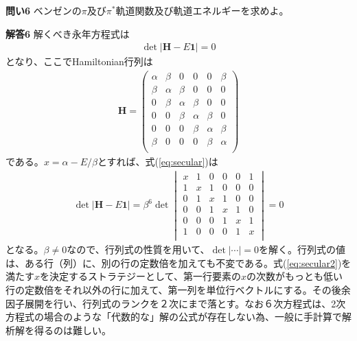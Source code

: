 \documentclass[11pt,pra,aps]{revtex4}
\begin{document}
\noindent
{\bf 問い6} ベンゼンの$\pi$及び$\pi^*$軌道関数及び軌道エネルギーを求めよ。

\noindent
{\bf 解答6}
解くべき永年方程式は
\begin{align}
  \det{|\mathbf{H}-E\mathbf{1}|}=0 \label{eq:secular}
\end{align}
となり、ここでHamiltonian行列は
\begin{align}
  \mathbf{H}=
  \begin{pmatrix}
    \alpha & \beta & 0 & 0 & 0 & \beta \\
    \beta & \alpha & \beta & 0 & 0 & 0 \\
    0 & \beta & \alpha & \beta & 0 & 0 \\
    0 & 0 & \beta & \alpha & \beta & 0 \\
    0 & 0 & 0 & \beta & \alpha & \beta \\
    \beta & 0 & 0 & 0 & \beta & \alpha \\                    
  \end{pmatrix}  
\end{align}
である。$x=\alpha-E/\beta$とすれば、式(\ref{eq:secular})は
\begin{align}
  \det{|\mathbf{H}-E\mathbf{1}|}=
  \beta^6\det
  \begin{vmatrix}
    x & 1 & 0 & 0 & 0 & 1 \\
    1 & x & 1 & 0 & 0 & 0 \\
    0 & 1 & x & 1 & 0 & 0 \\
    0 & 0 & 1 & x & 1 & 0 \\
    0 & 0 & 0 & 1 & x & 1 \\
    1 & 0 & 0 & 0 & 1 & x \\                        
  \end{vmatrix}
  =0\label{eq:secular2}
\end{align}
となる。$\beta\neq0$なので、行列式の性質を用いて、$\det|\cdots|=0$を解く。行列式の値は、ある行（列）に、別の行の定数倍を加えても不変である。式(\ref{eq:secular2})を満たす$x$を決定するストラテジーとして、第一行要素の$x$の次数がもっとも低い行の定数倍をそれ以外の行に加えて、第一列を単位行ベクトルにする。その後余因子展開を行い、行列式のランクを２次にまで落とす。なお６次方程式は、2次方程式の場合のような「代数的な」解の公式が存在しない為、一般に手計算で解析解を得るのは難しい。
\end{document}

